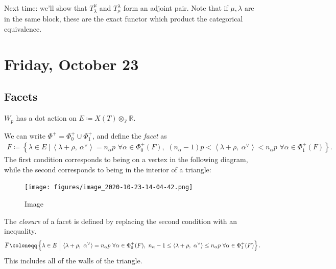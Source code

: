 Next time: we'll show that \(T_\lambda^\mu\) and \(T_\mu^\lambda\) form
an adjoint pair. Note that if \(\mu, \lambda\) are in the same block,
these are the exact functor which product the categorical equivalence.

\hypertarget{friday-october-23}{%
\section{Friday, October 23}\label{friday-october-23}}

\hypertarget{facets}{%
\subsection{Facets}\label{facets}}

\(W_p\) has a dot action on
\(E \coloneqq X(T) \otimes_{\mathbb{Z}}{\mathbb{R}}\).

\begin{definition}[Facet]

We can write \(\Phi^+ = \Phi_0^+ \cup\Phi_1^+\), and define the
\emph{facet} as
\begin{align*}  
F \coloneqq\left\{{
\lambda \in E {~\mathrel{\Big|}~}{\left\langle {\lambda + \rho},~{\alpha^\vee} \right\rangle} = n_\alpha p\,\, \forall\alpha\in \Phi_0^+(F),\,\,
(n_\alpha - 1)p < {\left\langle {\lambda + \rho},~{\alpha^\vee} \right\rangle} < n_\alpha p \,\,\forall \alpha\in \Phi_1^+(F)
}\right\}
.\end{align*}
The first condition corresponds to being on a vertex in the following
diagram, while the second corresponds to being in the interior of a
triangle:

\begin{figure}
\centering
\texttt{[image: figures/image\_2020-10-23-14-04-42.png]}
\caption{Image}
\end{figure}

\end{definition}

\begin{definition}

The \emph{closure} of a facet is defined by replacing the second
condition with an inequality.
\begin{align*}  
\mkern 1.5mu\overline{\mkern-1.5muF\mkern-1.5mu}\mkern 1.5mu \coloneqq\left\{{
\lambda \in E {~\mathrel{\Big|}~}{\left\langle {\lambda + \rho},~{\alpha^\vee} \right\rangle} = n_\alpha p\,\, 
\forall\alpha\in \Phi_0^+(F),\,\,
n_\alpha - 1 \leq  {\left\langle {\lambda + \rho},~{\alpha^\vee} \right\rangle} \leq n_\alpha p 
\,\,\forall \alpha\in \Phi_1^+(F)
}\right\}
.\end{align*}
This includes all of the walls of the triangle.

\end{definition}

